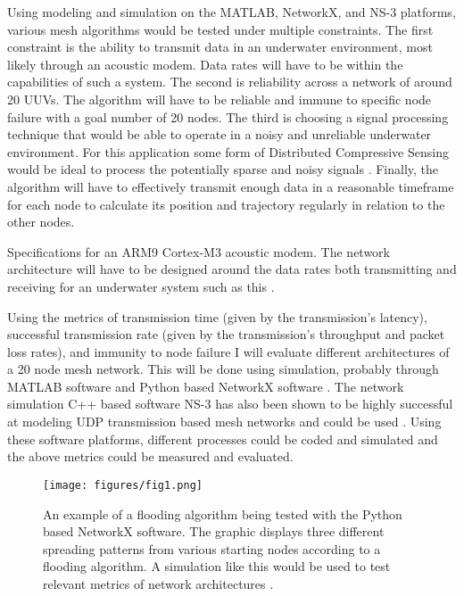 \documentclass[10pt]{article}
\begin{document}
Using modeling and simulation on the MATLAB, NetworkX, and NS-3 platforms, various mesh algorithms would be tested under multiple constraints. The first constraint is the ability to transmit data in an underwater environment, most likely through an acoustic modem. Data rates will have to be within the capabilities of such a system. The second is reliability across a network of around 20 UUVs. The algorithm will have to be reliable and immune to specific node failure with a goal number of 20 nodes. The third is choosing a signal processing technique that would be able to operate in a noisy and unreliable underwater environment. For this application some form of Distributed Compressive Sensing would be ideal to process the potentially sparse and noisy signals \cite{baron2009distributed}. Finally, the algorithm will have to effectively transmit enough data in a reasonable timeframe for each node to calculate its position and trajectory regularly in relation to the other nodes. 
\begin{table}[h]
\caption{Specifications for an ARM9 Cortex-M3 acoustic modem. The network architecture will have to be designed around the data rates both transmitting and receiving for an underwater system such as this \cite{arm2013acoustic}.}
\label{tab:1}
\begin{center}

\end{center}
\end{table}

Using the metrics of transmission time (given by the transmission’s latency), successful transmission rate (given by the transmission’s throughput and packet loss rates), and immunity to node failure I will evaluate different architectures of a 20 node mesh network. This will be done using simulation, probably through MATLAB software and Python based NetworkX software \cite{hagberg2008exploring}. The network simulation C++ based software NS-3 has also been shown to be highly successful at modeling UDP transmission based mesh networks and could be used \cite{dugaev2020wireless}. Using these software platforms, different processes could be coded and simulated and the above metrics could be measured and evaluated.
\begin{figure}
\begin{center}
\texttt{[image: figures/fig1.png]}
\end{center}
\caption{An example of a flooding algorithm being tested with the Python based NetworkX software. The graphic displays three different spreading patterns from various starting nodes according to a flooding algorithm. A simulation like this would be used to test relevant metrics of network architectures \cite{sphyce2015networkx}.}
\label{fig:2}
\end{figure}
\end{document}
